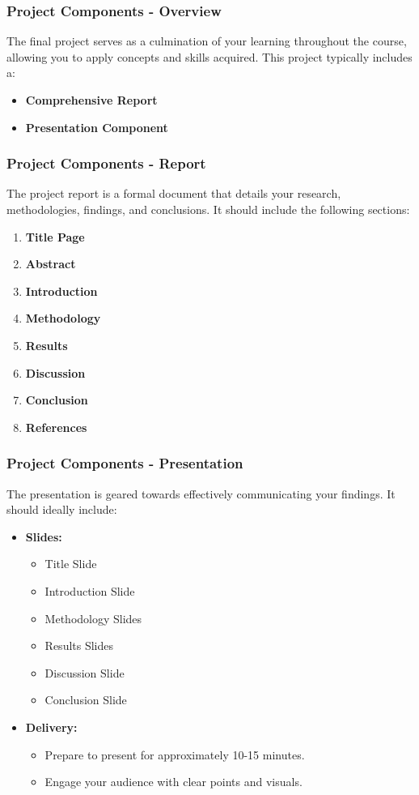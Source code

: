 \documentclass[aspectratio=169]{beamer}
\begin{document}
\begin{frame}[fragile]
    \frametitle{Project Components - Overview}
    The final project serves as a culmination of your learning throughout the course, allowing you to apply concepts and skills acquired. 
    This project typically includes a:
    \begin{itemize}
        \item \textbf{Comprehensive Report}
        \item \textbf{Presentation Component}
    \end{itemize}
\end{frame}

\begin{frame}[fragile]
    \frametitle{Project Components - Report}
    The project report is a formal document that details your research, methodologies, findings, and conclusions. It should include the following sections:
    \begin{enumerate}
        \item \textbf{Title Page}
        \item \textbf{Abstract}
        \item \textbf{Introduction}
        \item \textbf{Methodology}
        \item \textbf{Results}
        \item \textbf{Discussion}
        \item \textbf{Conclusion}
        \item \textbf{References}
    \end{enumerate}
\end{frame}

\begin{frame}[fragile]
    \frametitle{Project Components - Presentation}
    The presentation is geared towards effectively communicating your findings. It should ideally include:
    \begin{itemize}
        \item \textbf{Slides:}
            \begin{itemize}
                \item Title Slide
                \item Introduction Slide
                \item Methodology Slides
                \item Results Slides
                \item Discussion Slide
                \item Conclusion Slide
            \end{itemize}
        \item \textbf{Delivery:}
            \begin{itemize}
                \item Prepare to present for approximately 10-15 minutes.
                \item Engage your audience with clear points and visuals.
            \end{itemize}
    \end{itemize}
\end{frame}
\end{document}
